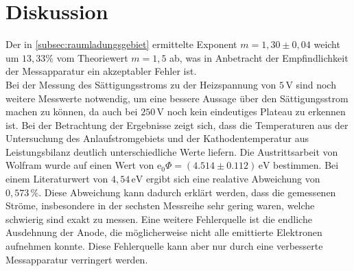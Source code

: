 \section{Diskussion}
\label{sec:Diskussion}

Der in \autoref{subsec:raumladungsgebiet} ermittelte Exponent $m = 1,30 \pm 0,04$ weicht um $13,33 \%$ vom Theoriewert
$m = 1,5$ ab, was in Anbetracht der Empfindlichkeit der Messapparatur ein akzeptabler Fehler ist. \\

Bei der Messung des Sättigungsstroms zu der Heizspannung von $5 \, \unit{\volt}$ sind noch weitere Messwerte notwendig, um eine bessere Aussage über den Sättigungsstrom machen zu können, da auch bei $250 \, \unit{\volt}$ noch kein eindeutiges Plateau zu erkennen ist.
Bei der Betrachtung der Ergebnisse zeigt sich, dass die Temperaturen aus der Untersuchung des Anlaufstromgebiets und der Kathodentemperatur aus Leistungsbilanz deutlich unterschiedliche Werte liefern.
Die Austrittsarbeit von Wolfram wurde auf einen Wert von $\text{e}_0 \Phi = (4.514 \pm 0.112) \,\unit{\eV}$ bestimmen. Bei einem Literaturwert von $4,54 \, \unit{\electronvolt}$ \cite{ap10} ergibt sich eine realative Abweichung von $ 0,573 \, \%$.
Diese Abweichung kann dadurch erklärt werden, dass die gemessenen Ströme, insbesondere in der sechsten Messreihe sehr gering waren, welche schwierig sind exakt zu messen.
Eine weitere Fehlerquelle ist die endliche Ausdehnung der Anode, die möglicherweise nicht alle emittierte Elektronen aufnehmen konnte. Diese Fehlerquelle kann aber nur durch eine verbesserte Messapparatur verringert werden.